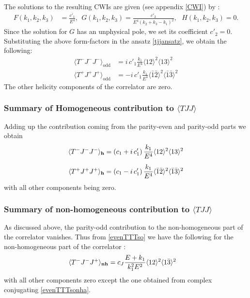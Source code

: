 \documentclass[a4paper,11pt]{article}
\begin{document}
The solutions to the resulting CWIs are given (see appendix \ref{CWI}) by :
\begin{align}
\label{tjjoddformfactorssh}
F(k_1, k_2, k_3)&=\frac{c'_1}{E^4},~~
G(k_1, k_2, k_3) =\frac{c'_2}{E^4 (k_2+k_3-k_1)^2},~~~H(k_1, k_2, k_3)=0.
\end{align}
Since the solution for $G$ has an unphysical pole, we set its coefficient $c'_2=0$. Substituting the above form-factors in the ansatz \eqref{tjjansatz}, we obtain the following:
\begin{align}
\label{tjjsh}
\langle T^-J^-J^- \rangle_{\text{odd}} &= i\,c'_1 \frac{k_1}{E^4}\langle 12 \rangle^2 \langle 13 \rangle^2\\[5 pt]
\langle T^+J^+J^+ \rangle_{\text{odd}} &= -i\,c'_1 \frac{k_1}{E^4}\langle \bar 1\bar 2 \rangle^2 \langle \bar 1\bar 3 \rangle^2
\end{align} 
The other helicity components of the correlator are zero.
\par 
\subsubsection*{Summary of Homogeneous contribution to {\bf{$\langle TJJ \rangle$}}}
Adding up the contribution coming from the parity-even and parity-odd parts we obtain
\begin{align}
\label{tjjshal}
\langle T^-J^-J^- \rangle_{\bf{h}} &= \left(c_1+i\,c_1'\right) \frac{k_1}{E^4}\langle 12 \rangle^2 \langle 13 \rangle^2\\[5 pt]
\langle T^+J^+J^+ \rangle_{\bf{h}} &= \left(c_1-i\,c_1'\right)\frac{k_1}{E^4}\langle \bar 1\bar 2 \rangle^2 \langle \bar 1\bar 3 \rangle^2
\end{align} with all other components being zero.
\subsubsection*{Summary of non-homogeneous contribution to {\bf{$\langle TJJ \rangle$}}}
As discussed above, the parity-odd contribution to the non-homogeneous part of the correlator vanishes. Thus from \eqref{evenTTTso} we have the following for the non-homogeneous part of the correlator :
\begin{align}\label{evenTTTsonha}
    \langle T^-J^- J^+ \rangle_{\bf{nh}} &= c_J \frac{E+k_1}{k_1^2 E^2}\langle 12 \rangle^2 \langle 1\bar{3}\rangle^2
\end{align} with all other components zero except the one obtained from complex conjugating \eqref{evenTTTsonha}.
\end{document}
